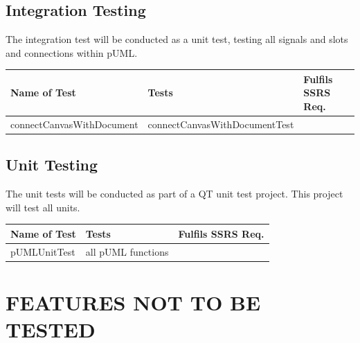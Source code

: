 \documentclass[twoside,letterpaper]{article}
\begin{document}
\subsection[]{\bfseries Integration Testing} 

The integration test will be conducted as a unit test, testing all signals and slots and connections within pUML.

\begin{flushleft}
\tablehead{}
\begin{tabular}{|m{1.5in} m{3.0in} m{2.0in}|}
\hline
{\bfseries Name of Test}
& {\bfseries Tests}
& {\bfseries Fulfils SSRS Req.}
\\\hline
connectCanvasWithDocument & connectCanvasWithDocumentTest & ~
\\\hline
\end{tabular}
\end{flushleft}
\bigskip


\subsection[]{\bfseries Unit Testing} 

The unit tests will be conducted as part of a QT unit test project. This project will test all units.

\begin{flushleft}
\tablehead{}
\begin{tabular}{|m{1.5in} m{3.0in} m{2.0in}|}
\hline
{\bfseries Name of Test}
& {\bfseries Tests}
& {\bfseries Fulfils SSRS Req.}
\\\hline
pUMLUnitTest & all pUML functions & ~
\\\hline
\end{tabular}
\end{flushleft}
\bigskip








\section[FEATURES NOT TO BE TESTED]{\bfseries
FEATURES NOT TO BE TESTED}

\end{document}

